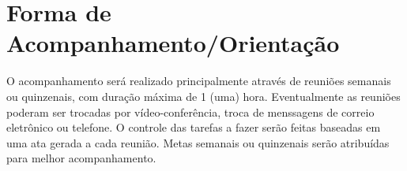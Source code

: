 \section{Forma de Acompanhamento/Orientação}

O acompanhamento será realizado principalmente através de reuniões semanais ou quinzenais, com duração máxima de 1 (uma) hora. 
%
Eventualmente as reuniões poderam ser trocadas por vídeo-conferência, troca de menssagens de correio eletrônico ou telefone. 
%
O controle das tarefas a fazer serão feitas baseadas em uma ata gerada a cada reunião. 
%
Metas semanais ou quinzenais serão atribuídas para melhor acompanhamento.
